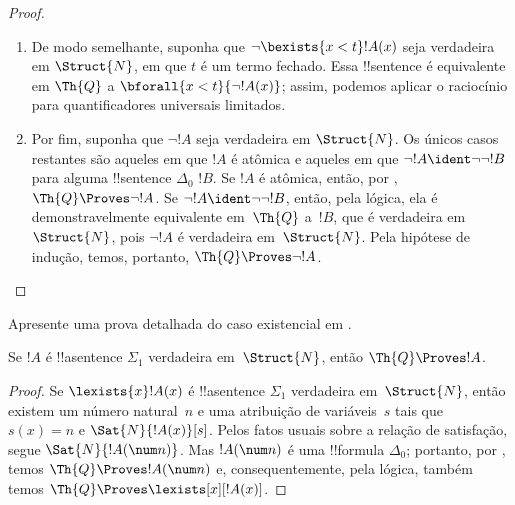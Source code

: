 \documentclass[../../../include/open-logic-section]{subfiles}
\begin{document}
\begin{proof}
\begin{enumerate}
equivalência derivável em~$\Th{Q}$; portanto, podemos aplicar o
raciocínio para quantificadores existenciais limitados.
%
\item De modo semelhante, suponha que $\lnot \bexists{x<t}!A(x)$ seja
verdadeira em $\Struct{N}$, em que $t$ é um termo fechado. Essa
!!{sentence} é equivalente em $\Th{Q}$ a
$\bforall{x<t}{\lnot!A(x)}$; assim, podemos aplicar o raciocínio para
quantificadores universais limitados.
%
\item Por fim, suponha que $\lnot !A$ seja verdadeira em $\Struct{N}$.
Os únicos casos restantes são aqueles em que $!A$ é atômica e aqueles
em que $\lnot !A \ident \lnot\lnot !B$ para alguma !!{sentence}
$\Delta_0$ $!B$. Se $!A$ é atômica, então, por
, $\Th{Q} \Proves \lnot !A$. Se
$\lnot !A \ident \lnot\lnot !B$, então, pela lógica, ela é
demonstravelmente equivalente em~$\Th{Q}$ a~$!B$, que é verdadeira
em~$\Struct{N}$, pois $\lnot !A$ é verdadeira em~$\Struct{N}$. Pela
hipótese de indução, temos, portanto, $\Th{Q} \Proves \lnot !A$.
\end{enumerate}
\end{proof}

\begin{prob}
Apresente uma prova detalhada do caso existencial em
.
\end{prob}

\begin{thm}
Se $!A$ é !!a{sentence} $\Sigma_1$ verdadeira em~$\Struct{N}$, então
$\Th{Q} \Proves !A$.
\end{thm}

\begin{proof}
Se $\lexists{x}!A(x)$ é !!a{sentence} $\Sigma_1$ verdadeira
em~$\Struct{N}$, então existem um número natural~$n$ e uma atribuição
de variáveis~$s$ tais que $s(x) = n$ e $\Sat{N}{!A(x)}[s]$. Pelos
fatos usuais sobre a relação de satisfação, segue
$\Sat{N}{!A(\num n)}$. Mas $!A(\num n)$ é uma !!{formula} $\Delta_0$;
portanto, por , temos
$\Th{Q} \Proves !A(\num n)$ e, consequentemente, pela lógica, também
temos $\Th{Q} \Proves \lexists[x][!A(x)]$.
\end{proof}
\end{document}
